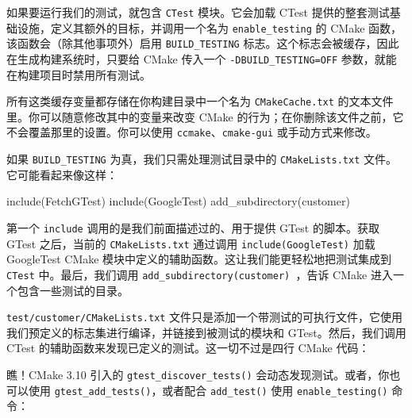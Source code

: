 如果要运行我们的测试，就包含 \texttt{CTest} 模块。它会加载 CTest 提供的整套测试基础设施，定义其额外的目标，并调用一个名为 \texttt{enable\_\allowbreak{}testing} 的 CMake 函数，该函数会（除其他事项外）启用 \texttt{BUILD\_\allowbreak{}TESTING} 标志。这个标志会被缓存，因此在生成构建系统时，只要给 CMake 传入一个 \texttt{-DBUILD\_\allowbreak{}TESTING=\allowbreak{}OFF} 参数，就能在构建项目时禁用所有测试。

所有这类缓存变量都存储在你构建目录中一个名为 \texttt{CMake\allowbreak{}Cache.\allowbreak{}txt} 的文本文件里。你可以随意修改其中的变量来改变 CMake 的行为；在你删除该文件之前，它不会覆盖那里的设置。你可以使用 \texttt{ccmake}、\texttt{cmake-gui} 或手动方式来修改。

如果 \texttt{BUILD\_\allowbreak{}TESTING} 为真，我们只需处理测试目录中的 \texttt{CMake\allowbreak{}Lists.\allowbreak{}txt} 文件。它可能看起来像这样：

\begin{codebox}[cmake]
include(FetchGTest)
include(GoogleTest)
add_subdirectory(customer)
\end{codebox}

\label{idx:695}
第一个 \texttt{include} 调用的是我们前面描述过的、用于提供 GTest 的脚本。获取 GTest 之后，当前的 \texttt{CMake\allowbreak{}Lists.\allowbreak{}txt} 通过调用 \texttt{include(\allowbreak{}Google\allowbreak{}Test)\allowbreak{}} 加载 GoogleTest CMake 模块中定义的辅助函数。这让我们能更轻松地把测试集成到 \texttt{CTest} 中。最后，我们调用 \texttt{add\_\allowbreak{}subdirectory(\allowbreak{}customer)\allowbreak{} }，告诉 CMake 进入一个包含一些测试的目录。

\texttt{test/\allowbreak{}customer/\allowbreak{}CMake\allowbreak{}Lists.\allowbreak{}txt} 文件只是添加一个带测试的可执行文件，它使用我们预定义的标志集进行编译，并链接到被测试的模块和 GTest。然后，我们调用 CTest 的辅助函数来发现已定义的测试。这一切不过是四行 CMake 代码：


瞧！CMake 3.10 引入的 \texttt{gtest\_\allowbreak{}discover\_\allowbreak{}tests(\allowbreak{})\allowbreak{}} 会动态发现测试。或者，你也可以使用 \texttt{gtest\_\allowbreak{}add\_\allowbreak{}tests(\allowbreak{})\allowbreak{}}，或者配合 \texttt{add\_\allowbreak{}test(\allowbreak{})\allowbreak{}} 使用 \texttt{enable\_\allowbreak{}testing(\allowbreak{})\allowbreak{}} 命令：

